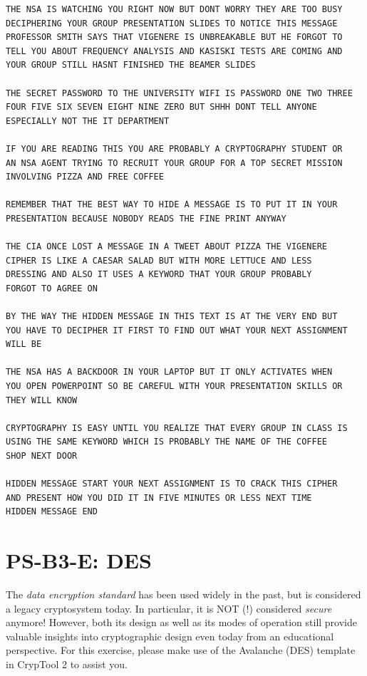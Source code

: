 \documentclass[]{scrartcl}
\newcounter{exercise}
\newcommand{\blockid}{B3}
\newcommand{\exname}{}
\begin{document}
\begin{lstlisting}[breaklines=true,
                   basicstyle=\ttfamily\scriptsize,
                   columns=fullflexible,
                   frame=single]
THE NSA IS WATCHING YOU RIGHT NOW BUT DONT WORRY THEY ARE TOO BUSY
DECIPHERING YOUR GROUP PRESENTATION SLIDES TO NOTICE THIS MESSAGE
PROFESSOR SMITH SAYS THAT VIGENERE IS UNBREAKABLE BUT HE FORGOT TO
TELL YOU ABOUT FREQUENCY ANALYSIS AND KASISKI TESTS ARE COMING AND
YOUR GROUP STILL HASNT FINISHED THE BEAMER SLIDES

THE SECRET PASSWORD TO THE UNIVERSITY WIFI IS PASSWORD ONE TWO THREE
FOUR FIVE SIX SEVEN EIGHT NINE ZERO BUT SHHH DONT TELL ANYONE
ESPECIALLY NOT THE IT DEPARTMENT

IF YOU ARE READING THIS YOU ARE PROBABLY A CRYPTOGRAPHY STUDENT OR
AN NSA AGENT TRYING TO RECRUIT YOUR GROUP FOR A TOP SECRET MISSION
INVOLVING PIZZA AND FREE COFFEE

REMEMBER THAT THE BEST WAY TO HIDE A MESSAGE IS TO PUT IT IN YOUR
PRESENTATION BECAUSE NOBODY READS THE FINE PRINT ANYWAY

THE CIA ONCE LOST A MESSAGE IN A TWEET ABOUT PIZZA THE VIGENERE
CIPHER IS LIKE A CAESAR SALAD BUT WITH MORE LETTUCE AND LESS
DRESSING AND ALSO IT USES A KEYWORD THAT YOUR GROUP PROBABLY
FORGOT TO AGREE ON

BY THE WAY THE HIDDEN MESSAGE IN THIS TEXT IS AT THE VERY END BUT
YOU HAVE TO DECIPHER IT FIRST TO FIND OUT WHAT YOUR NEXT ASSIGNMENT
WILL BE

THE NSA HAS A BACKDOOR IN YOUR LAPTOP BUT IT ONLY ACTIVATES WHEN
YOU OPEN POWERPOINT SO BE CAREFUL WITH YOUR PRESENTATION SKILLS OR
THEY WILL KNOW

CRYPTOGRAPHY IS EASY UNTIL YOU REALIZE THAT EVERY GROUP IN CLASS IS
USING THE SAME KEYWORD WHICH IS PROBABLY THE NAME OF THE COFFEE
SHOP NEXT DOOR

HIDDEN MESSAGE START YOUR NEXT ASSIGNMENT IS TO CRACK THIS CIPHER
AND PRESENT HOW YOU DID IT IN FIVE MINUTES OR LESS NEXT TIME
HIDDEN MESSAGE END
\end{lstlisting}

\pagebreak
{}
\renewcommand{\exname}{DES}
\section*{PS-\blockid{}-E\theexercise: DES}
The \emph{data encryption standard} has been used widely in the past, but is considered a legacy cryptosystem today. In particular, it is NOT (!) considered \emph{secure} anymore! However, both its design as well as its modes of operation still provide valuable insights into cryptographic design even today from an educational perspective. For this exercise, please make use of the Avalanche (DES) template in CrypTool 2 to assist you. 
\end{document}
